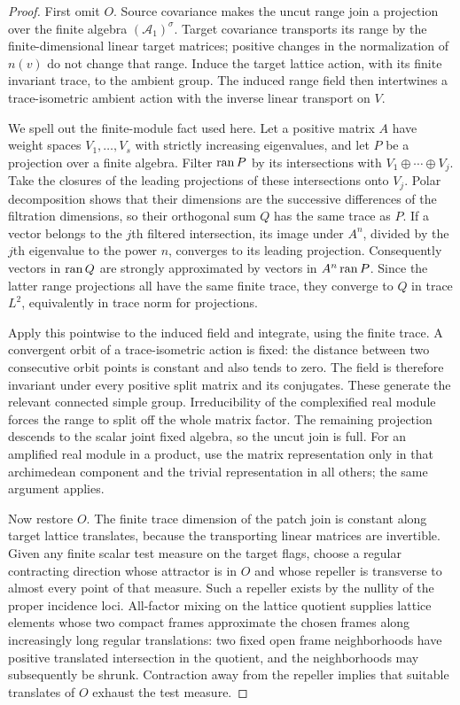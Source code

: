 \begin{proof}
First omit $O$. Source covariance makes the uncut range join a
projection over the finite algebra $(\mathcal A_1)^\sigma$. Target
covariance transports its range by the finite-dimensional linear
target matrices; positive changes in the normalization of $n(v)$ do
not change that range. Induce the target lattice action, with its
finite invariant trace, to the ambient group. The induced range field
then intertwines a trace-isometric ambient action with the inverse
linear transport on $V$.

We spell out the finite-module fact used here. Let a positive matrix
$A$ have weight spaces $V_1,\ldots,V_s$ with strictly increasing
eigenvalues, and let $P$ be a projection over a finite algebra. Filter
$\operatorname{ran} P$ by its intersections with $V_1\oplus\cdots\oplus V_j$.
Take the closures of the leading projections of these intersections
onto $V_j$. Polar decomposition shows that their dimensions are the
successive differences of the filtration dimensions, so their
orthogonal sum $Q$ has the same trace as $P$. If a vector belongs to
the $j$th filtered intersection, its image under $A^n$, divided by the
$j$th eigenvalue to the power $n$, converges to its leading projection.
Consequently vectors in $\operatorname{ran} Q$ are strongly approximated by vectors
in $A^n\operatorname{ran} P$. Since the latter range projections all have the same
finite trace, they converge to $Q$ in trace $L^2$, equivalently in
trace norm for projections.

Apply this pointwise to the induced field and integrate, using the
finite trace. A convergent orbit of a trace-isometric action is fixed:
the distance between two consecutive orbit points is constant and
also tends to zero. The field is therefore invariant under every
positive split matrix and its conjugates. These generate the relevant
connected simple group. Irreducibility of the complexified real
module forces the range to split off the whole matrix factor. The
remaining projection descends to the scalar joint fixed algebra, so
the uncut join is full. For an amplified real module in a product,
use the matrix representation only in that archimedean component and
the trivial representation in all others; the same argument applies.

Now restore $O$. The finite trace dimension of the patch join is
constant along target lattice translates, because the transporting
linear matrices are invertible. Given any finite scalar test measure
on the target flags, choose a regular contracting direction whose
attractor is in $O$ and whose repeller is transverse to almost every
point of that measure. Such a repeller exists by the nullity of the
proper incidence loci. All-factor mixing on the lattice quotient
supplies lattice elements whose two compact frames approximate the
chosen frames along increasingly long regular translations: two
fixed open frame neighborhoods have positive translated intersection
in the quotient, and the neighborhoods may subsequently be shrunk.
Contraction away from the repeller implies that suitable translates
of $O$ exhaust the test measure.


\end{proof}
